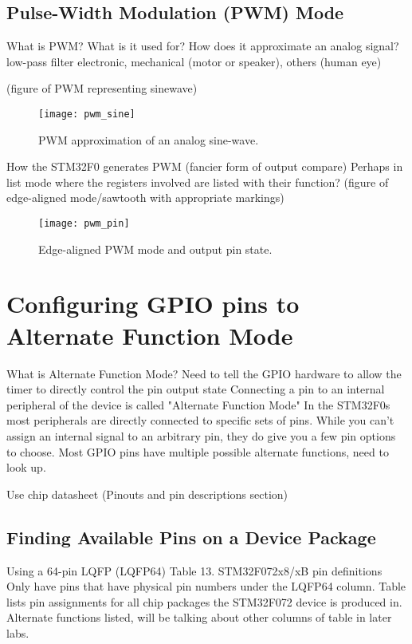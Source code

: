 \documentclass[11pt,fleqn]{book} %
\begin{document}
    \subsection{Pulse-Width Modulation (PWM) Mode}
    What is PWM?
    What is it used for? How does it approximate an analog signal?
        low-pass filter
        electronic, mechanical (motor or speaker), others (human eye)
        
    (figure of PWM representing sinewave)
    \begin{figure}[]
        \centering\texttt{[image: pwm\_sine]}
        \caption{PWM approximation of an analog sine-wave.}
        \label{pwm_sine}
    \end{figure}
    
    How the STM32F0 generates PWM (fancier form of output compare)
    Perhaps in list mode where the registers involved are listed with their function?
    (figure of edge-aligned mode/sawtooth with appropriate markings)
     \begin{figure}[]
        \centering\texttt{[image: pwm\_pin]}
        \caption{Edge-aligned PWM mode and output pin state.}
        \label{pwm_pin}
    \end{figure}

\section{Configuring GPIO pins to Alternate Function Mode}
    What is Alternate Function Mode?
    Need to tell the GPIO hardware to allow the timer to directly control the pin output state
    Connecting a pin to an internal peripheral of the device is called "Alternate Function Mode"
    In the STM32F0s most peripherals are directly connected to specific sets of pins. 
        While you can't assign an internal signal to an arbitrary pin, they do give you a few pin options to choose.
        Most GPIO pins have multiple possible alternate functions, need to look up. 
    
    Use chip datasheet (Pinouts and pin descriptions section)
    
    \subsection{Finding Available Pins on a Device Package}
    Using a 64-pin LQFP (LQFP64)
    Table 13. STM32F072x8/xB pin definitions
    Only have pins that have physical pin numbers under the LQFP64 column. Table lists pin assignments for all chip packages the STM32F072 device is produced in.
    Alternate functions listed, will be talking about other columns of table in later labs.
    
\end{document}
